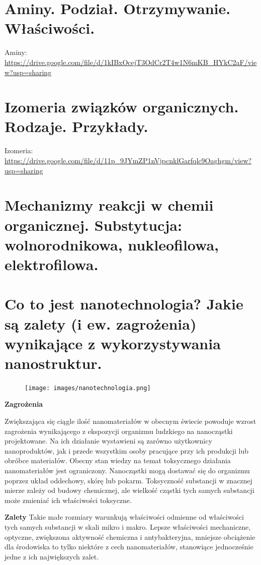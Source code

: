 \documentclass{article}
\begin{document}
\section{Aminy. Podział. Otrzymywanie. Właściwości.}
Aminy: \url{https://drive.google.com/file/d/1kIBxOcejT3OdCr2T4w1N6mKB_HYkC2aF/view?usp=sharing}

\section{Izomeria związków organicznych. Rodzaje. Przykłady.}
Izomeria: \url{https://drive.google.com/file/d/11p_9JYmZP1nVjpcnklGarfqlc9Oaghgm/view?usp=sharing}

\section{Mechanizmy reakcji w chemii organicznej. Substytucja: wolnorodnikowa, nukleofilowa, elektrofilowa.}


\section{Co to jest nanotechnologia? Jakie są zalety (i ew. zagrożenia) wynikające z wykorzystywania nanostruktur.}
\begin{figure}[H]
    \centering
    \texttt{[image: images/nanotechnologia.png]}
\end{figure}

\textbf{Zagrożenia}

Zwiększająca się ciągle ilość nanomateriałów w obecnym świecie powoduje wzrost zagrożenia wynikającego z ekspozycji organizmu ludzkiego na nanocząstki projektowane. Na ich działanie wystawieni są zarówno użytkownicy nanoproduktów, jak i przede wszystkim osoby pracujące przy ich produkcji lub obróbce materiałów. Obecny stan wiedzy na temat toksycznego działania nanomateriałów jest ograniczony. Nanocząstki mogą dostawać się do organizmu poprzez układ oddechowy, skórę lub pokarm. Toksyczność 
substancji w znacznej mierze zależy od budowy chemicznej, ale wielkość cząstki tych samych substancji może zmieniać ich właściwości toksyczne. 

\textbf{Zalety}
Takie małe rozmiary warunkują właściwości odmienne od właściwości tych samych substancji w skali mikro i makro. Lepsze właściwości mechaniczne, optyczne, zwiększona aktywność chemiczna i  antybakteryjna, mniejsze obciążenie dla środowiska to tylko niektóre z cech nanomateriałów, stanowiące jednocześnie jedne z ich największych zalet.
\end{document}
